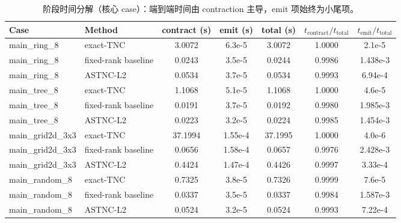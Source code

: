 ﻿\begin{table}[t]
\centering
\small
\caption{阶段时间分解（核心 case）：端到端时间由 contraction 主导，emit 项始终为小尾项。}
\label{tab:gain-breakdown-stage}
\begin{tabular}{llccccc}
\toprule
Case & Method & contract (s) & emit (s) & total (s) & $t_{\mathrm{contract}}/t_{\mathrm{total}}$ & $t_{\mathrm{emit}}/t_{\mathrm{total}}$ \\
\midrule
main\_ring\_8 & exact-TNC & 3.0072 & 6.3e-5 & 3.0072 & 1.0000 & 2.1e-5 \\
main\_ring\_8 & fixed-rank baseline & 0.0243 & 3.5e-5 & 0.0244 & 0.9986 & 1.438e-3 \\
main\_ring\_8 & ASTNC-L2 & 0.0534 & 3.7e-5 & 0.0534 & 0.9993 & 6.94e-4 \\
\midrule
main\_tree\_8 & exact-TNC & 1.1068 & 5.1e-5 & 1.1068 & 1.0000 & 4.6e-5 \\
main\_tree\_8 & fixed-rank baseline & 0.0191 & 3.7e-5 & 0.0192 & 0.9980 & 1.985e-3 \\
main\_tree\_8 & ASTNC-L2 & 0.0223 & 3.2e-5 & 0.0224 & 0.9985 & 1.454e-3 \\
\midrule
main\_grid2d\_3x3 & exact-TNC & 37.1994 & 1.55e-4 & 37.1995 & 1.0000 & 4.0e-6 \\
main\_grid2d\_3x3 & fixed-rank baseline & 0.0656 & 1.58e-4 & 0.0657 & 0.9976 & 2.428e-3 \\
main\_grid2d\_3x3 & ASTNC-L2 & 0.4424 & 1.47e-4 & 0.4426 & 0.9997 & 3.33e-4 \\
\midrule
main\_random\_8 & exact-TNC & 0.7325 & 3.8e-5 & 0.7326 & 0.9999 & 7.6e-5 \\
main\_random\_8 & fixed-rank baseline & 0.0337 & 3.5e-5 & 0.0337 & 0.9984 & 1.587e-3 \\
main\_random\_8 & ASTNC-L2 & 0.0524 & 3.2e-5 & 0.0524 & 0.9993 & 7.22e-4 \\
\bottomrule
\end{tabular}
\end{table}

\begin{table}[t]
\centering
\small
\caption{收益分解汇总（核心 case）：总加速基本由 contraction-side gain 解释。}
\label{tab:gain-breakdown-summary}
\end{table}
